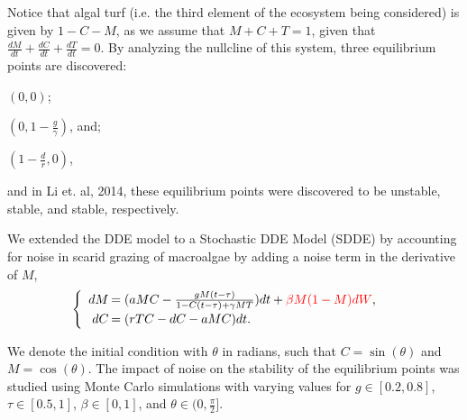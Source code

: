 Notice that algal turf (i.e. the third element of the ecosystem being considered) is given by $1-C-M$, as we assume that $M+C+T=1$, given that $\frac{dM}{dt}+\frac{dC}{dt}+\frac{dT}{dt}=0$. By analyzing the nullcline of this system, three equilibrium points are discovered:\begin{inparaenum}[(A)]
\setcounter{enumi}{13}
\item $(0,0)$;\setcounter{enumi}{1}
\item $(0,1-\frac{g}{\gamma})$, and;\setcounter{enumi}{3}
\item $(1-\frac{d}{r},0)$,
\end{inparaenum} and in Li et. al, 2014, these equilibrium points were discovered to be unstable, stable, and stable, respectively.

We extended the DDE model to a Stochastic DDE Model (SDDE) by accounting for noise in scarid grazing of macroalgae by adding a noise term in the derivative of $M$, 
$$\begin{cases}
\begin{array}{rl}
dM\hspace{-.8em}&=(aMC - \frac{gM(t-\tau)}{1-C(t-\tau)+\gamma M T})dt+{\color{red}\beta M(1-M)dW},\\
dC\hspace{-.8em}&=(rTC  - dC - aMC)dt.\\
\end{array}
\end{cases}$$ 

We denote the initial condition with $\theta$ in radians, such that $C=\sin(\theta)$ and $M=\cos(\theta)$. The impact of noise on the stability of the equilibrium points was studied using Monte Carlo simulations with varying values for $g\in[0.2,0.8]$, $\tau\in[0.5,1]$, $\beta\in[0,1]$, and $\theta\in(0,\frac{\pi}{2}]$.